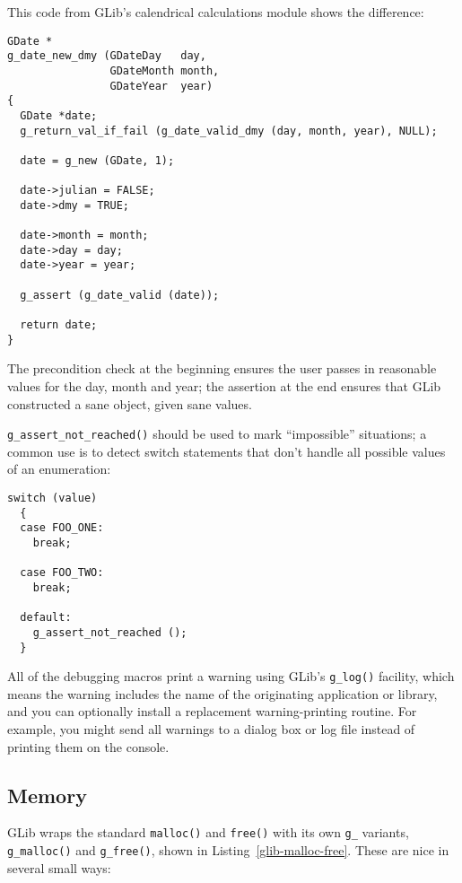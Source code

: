 This code from GLib's calendrical calculations module shows the difference:
\begin{lstlisting}
GDate *
g_date_new_dmy (GDateDay   day,
                GDateMonth month,
                GDateYear  year)
{
  GDate *date;
  g_return_val_if_fail (g_date_valid_dmy (day, month, year), NULL);

  date = g_new (GDate, 1);

  date->julian = FALSE;
  date->dmy = TRUE;

  date->month = month;
  date->day = day;
  date->year = year;

  g_assert (g_date_valid (date));

  return date;
}
\end{lstlisting}

The precondition check at the beginning ensures the user passes in reasonable values for the day, month and year; the assertion at the end ensures that GLib constructed a sane object, given sane values.

\lstinline{g_assert_not_reached()} should be used to mark ``impossible'' situations; a common use is to detect switch statements that don't handle all possible values of an enumeration:
\begin{lstlisting}
switch (value)
  {
  case FOO_ONE:
    break;

  case FOO_TWO:
    break;

  default:
    g_assert_not_reached ();
  }
\end{lstlisting}

All of the debugging macros print a warning using GLib's \lstinline{g_log()} facility, which means the warning includes the name of the originating application or library, and you can optionally install a replacement warning-printing routine. For example, you might send all warnings to a dialog box or log file instead of printing them on the console.

\subsection{Memory}

GLib wraps the standard \lstinline{malloc()} and \lstinline{free()} with its own \lstinline{g_} variants, \lstinline{g_malloc()} and \lstinline{g_free()}, shown in Listing~\ref{glib-malloc-free}.
These are nice in several small ways:

